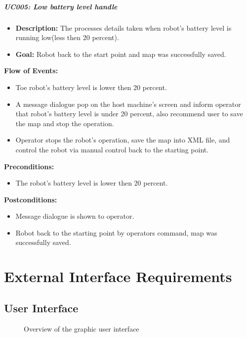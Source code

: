\documentclass[11pt, a4paper]{report}
\begin{document}
\paragraph {UC005: Low battery level handle}
	\begin{itemize}
		\item \textbf{Description:} The processes details taken when robot's battery level is running low(less then 20 percent).
		\item \textbf{Goal:} Robot back to the start point and map was successfully saved.
	\end{itemize}
		\textbf{Flow of Events:}
	\begin{itemize}
		\item Toe robot's battery level is lower then 20 percent.
		\item A message dialogue pop on the host machine's screen and inform operator that robot's battery level is under 20 percent, also recommend user to save the map and stop the operation.
		\item Operator stops the robot's operation, save the map into XML file, and control the robot via manual control back to the starting point.
	\end{itemize}
	\textbf{Preconditions:}
	\begin{itemize}
		\item The robot's battery level is lower then 20 percent.
	\end{itemize}
	\textbf{Postconditions:}
	\begin{itemize}
		\item Message dialogue is shown to operator.
		\item Robot back to the starting point by operators command, map was successfully saved.
	\end{itemize}
\pagebreak
 


\chapter{External Interface Requirements}

\section{User Interface}

\begin{figure}[ht]
\centering
\setlength\fboxsep{2pt}
\setlength\fboxrule{0.2pt}
\caption{Overview of the graphic user interface}
\label{sec:GUI}
\label{fig:GUI}
\end{figure}
\end{document}
